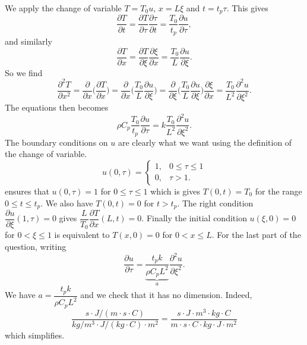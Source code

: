 
We apply the change of variable $T=T_{0}u$, $x=L\xi$ and $t=t_{p}\tau$. This gives 
$$\dfrac{\partial T}{\partial t } = \dfrac{\partial T}{\partial \tau }\dfrac{\partial \tau}{\partial t }= \dfrac{T_0}{t_p}\dfrac{\partial u}{\partial \tau },$$
and similarly 
$$\dfrac{\partial T}{\partial x}=\dfrac{\partial T}{\partial \xi}\dfrac{\partial \xi}{\partial x}=\dfrac{T_0}{L}\dfrac{\partial u}{\partial \xi}.$$
So we find
$$
\dfrac{\partial^2 T}{\partial x^2} = \dfrac{\partial }{\partial x}\Big(\dfrac{\partial T}{\partial x}\Big)
= \dfrac{\partial }{\partial x}\Big(\dfrac{T_0}{L}\dfrac{\partial u}{\partial \xi}\Big)
=\dfrac{\partial }{\partial \xi}\Big(\dfrac{T_0}{L}\dfrac{\partial u}{\partial \xi}\Big)\dfrac{\partial \xi}{\partial x}
=\dfrac{T_0}{L^2} \dfrac{\partial^2 u}{\partial \xi^2}.$$
The equations then becomes 
$$\rho C_p \dfrac{T_0}{t_p}\dfrac{\partial u}{\partial \tau } = k \dfrac{T_0}{L^2} \dfrac{\partial^2 u}{\partial \xi^2 }.$$
The boundary conditions on $u$ are clearly what we want using the definition of the change of variable.
$$u(0,\tau) = \left\{ \begin{array}{ll}
1, & 0\leq \tau \leq 1 \\
0, & \tau > 1.
\end{array}\right.$$ ensures that $u(0,\tau)=1$ for $0\leq \tau \leq 1$ which is gives $T(0,t)=T_0$ for the range $0\leq t \leq t_p$. We also have $T(0,t)=0$ for $t>t_p$.
The right condition $\dfrac{\partial u}{\partial \xi }(1,\tau)=0$ gives $\dfrac{L}{T_0}\dfrac{\partial T}{\partial x }(L,t)=0$. Finally the initial condition $u(\xi,0)=0$ for $0<\xi \leq 1$ is equivalent to $T(x,0)=0$ for $0<x\leq L$.\newline
For the last part of the question, writing 
$$ \dfrac{\partial u}{\partial \tau } = \underbrace{\dfrac{t_p k}{\rho C_p L^2}}_{a} \dfrac{\partial^2 u}{\partial \xi^2 }.$$
We have $a=\dfrac{t_p k}{\rho C_p L^2}$ and we check that it has no dimension. Indeed,  $$\dfrac{s \cdot J/(m \cdot s \cdot C) }{kg/m^3 \cdot J/(kg \cdot C) \cdot m^2}=
\dfrac{s \cdot J \cdot m^3 \cdot kg \cdot C}{m \cdot s \cdot C \cdot kg \cdot J \cdot m^2} $$ which simplifies.








  